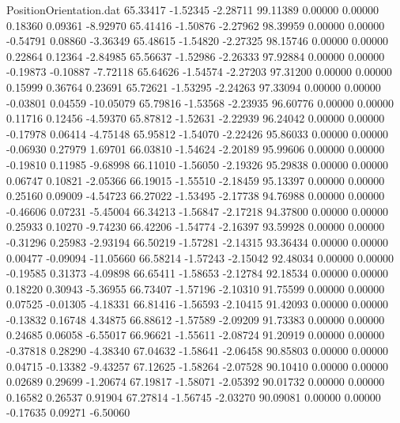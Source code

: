 \begin{filecontents}{PositionOrientation.dat}
  65.33417   -1.52345   -2.28711    99.11389    0.00000    0.00000    0.18360    0.09361   -8.92970
  65.41416   -1.50876   -2.27962    98.39959    0.00000    0.00000   -0.54791    0.08860   -3.36349
  65.48615   -1.54820   -2.27325    98.15746    0.00000    0.00000    0.22864    0.12364   -2.84985
  65.56637   -1.52986   -2.26333    97.92884    0.00000    0.00000   -0.19873   -0.10887   -7.72118
  65.64626   -1.54574   -2.27203    97.31200    0.00000    0.00000    0.15999    0.36764    0.23691
  65.72621   -1.53295   -2.24263    97.33094    0.00000    0.00000   -0.03801    0.04559  -10.05079
  65.79816   -1.53568   -2.23935    96.60776    0.00000    0.00000    0.11716    0.12456   -4.59370
  65.87812   -1.52631   -2.22939    96.24042    0.00000    0.00000   -0.17978    0.06414   -4.75148
  65.95812   -1.54070   -2.22426    95.86033    0.00000    0.00000   -0.06930    0.27979    1.69701
  66.03810   -1.54624   -2.20189    95.99606    0.00000    0.00000   -0.19810    0.11985   -9.68998
  66.11010   -1.56050   -2.19326    95.29838    0.00000    0.00000    0.06747    0.10821   -2.05366
  66.19015   -1.55510   -2.18459    95.13397    0.00000    0.00000    0.25160    0.09009   -4.54723
  66.27022   -1.53495   -2.17738    94.76988    0.00000    0.00000   -0.46606    0.07231   -5.45004
  66.34213   -1.56847   -2.17218    94.37800    0.00000    0.00000    0.25933    0.10270   -9.74230
  66.42206   -1.54774   -2.16397    93.59928    0.00000    0.00000   -0.31296    0.25983   -2.93194
  66.50219   -1.57281   -2.14315    93.36434    0.00000    0.00000    0.00477   -0.09094  -11.05660
  66.58214   -1.57243   -2.15042    92.48034    0.00000    0.00000   -0.19585    0.31373   -4.09898
  66.65411   -1.58653   -2.12784    92.18534    0.00000    0.00000    0.18220    0.30943   -5.36955
  66.73407   -1.57196   -2.10310    91.75599    0.00000    0.00000    0.07525   -0.01305   -4.18331
  66.81416   -1.56593   -2.10415    91.42093    0.00000    0.00000   -0.13832    0.16748    4.34875
  66.88612   -1.57589   -2.09209    91.73383    0.00000    0.00000    0.24685    0.06058   -6.55017
  66.96621   -1.55611   -2.08724    91.20919    0.00000    0.00000   -0.37818    0.28290   -4.38340
  67.04632   -1.58641   -2.06458    90.85803    0.00000    0.00000    0.04715   -0.13382   -9.43257
  67.12625   -1.58264   -2.07528    90.10410    0.00000    0.00000    0.02689    0.29699   -1.20674
  67.19817   -1.58071   -2.05392    90.01732    0.00000    0.00000    0.16582    0.26537    0.91904
  67.27814   -1.56745   -2.03270    90.09081    0.00000    0.00000   -0.17635    0.09271   -6.50060

\end{filecontents}
